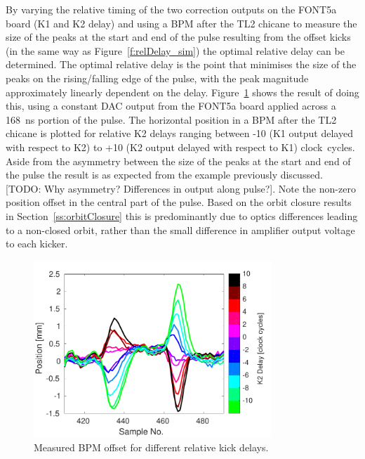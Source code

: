 By varying the relative timing of the two correction outputs on the FONT5a board (K1 and K2 delay) and using a BPM after the TL2 chicane to measure the size of the peaks at the start and end of the pulse resulting from the offset kicks (in the same way as Figure~\ref{f:relDelay_sim}) the optimal relative delay can be determined. The optimal relative delay is the point that minimises the size of the peaks on the rising/falling edge of the pulse, with the peak magnitude  approximately linearly dependent on the delay. Figure~\ref{f:relDelay_traces} shows the result of doing this, using a constant DAC output from the FONT5a board applied across a 168~ns portion of the pulse. The horizontal position in a BPM after the TL2 chicane is plotted for relative K2 delays ranging between -10 (K1 output delayed with respect to K2) to +10 (K2 output delayed with respect to K1) clock~cycles. Aside from the asymmetry between the size of the peaks at the start and end of the pulse the result is as expected from the example previously discussed. [TODO: Why asymmetry? Differences in output along pulse?]. Note the non-zero position offset in the central part of the pulse. Based on the orbit closure results in Section~\ref{ss:orbitClosure} this is predominantly due to optics differences leading to a non-closed orbit, rather than the small difference in amplifier output voltage to each kicker.

\begin{figure}
  \centering
  \includegraphics[width=0.8\textwidth]{Figures/commissioning/relDelay_traces}
  \caption{Measured BPM offset for different relative kick delays.}
  \label{f:relDelay_traces}
\end{figure}

